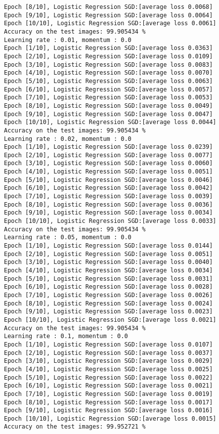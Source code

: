\documentclass[10pt]{article}
\newcommand{\0}{{\mathbf{0}}}
\newcommand{\1}{{\mathbf{1}}}
\begin{document}
\begin{verbatim}
Epoch [8/10], Logistic Regression SGD:[average loss 0.0068]
Epoch [9/10], Logistic Regression SGD:[average loss 0.0064]
Epoch [10/10], Logistic Regression SGD:[average loss 0.0061]
Accuracy on the test images: 99.905434 %
Learning rate : 0.01, momentum : 0.0
Epoch [1/10], Logistic Regression SGD:[average loss 0.0363]
Epoch [2/10], Logistic Regression SGD:[average loss 0.0109]
Epoch [3/10], Logistic Regression SGD:[average loss 0.0083]
Epoch [4/10], Logistic Regression SGD:[average loss 0.0070]
Epoch [5/10], Logistic Regression SGD:[average loss 0.0063]
Epoch [6/10], Logistic Regression SGD:[average loss 0.0057]
Epoch [7/10], Logistic Regression SGD:[average loss 0.0053]
Epoch [8/10], Logistic Regression SGD:[average loss 0.0049]
Epoch [9/10], Logistic Regression SGD:[average loss 0.0047]
Epoch [10/10], Logistic Regression SGD:[average loss 0.0044]
Accuracy on the test images: 99.905434 %
Learning rate : 0.02, momentum : 0.0
Epoch [1/10], Logistic Regression SGD:[average loss 0.0239]
Epoch [2/10], Logistic Regression SGD:[average loss 0.0077]
Epoch [3/10], Logistic Regression SGD:[average loss 0.0060]
Epoch [4/10], Logistic Regression SGD:[average loss 0.0051]
Epoch [5/10], Logistic Regression SGD:[average loss 0.0046]
Epoch [6/10], Logistic Regression SGD:[average loss 0.0042]
Epoch [7/10], Logistic Regression SGD:[average loss 0.0039]
Epoch [8/10], Logistic Regression SGD:[average loss 0.0036]
Epoch [9/10], Logistic Regression SGD:[average loss 0.0034]
Epoch [10/10], Logistic Regression SGD:[average loss 0.0033]
Accuracy on the test images: 99.905434 %
Learning rate : 0.05, momentum : 0.0
Epoch [1/10], Logistic Regression SGD:[average loss 0.0144]
Epoch [2/10], Logistic Regression SGD:[average loss 0.0051]
Epoch [3/10], Logistic Regression SGD:[average loss 0.0040]
Epoch [4/10], Logistic Regression SGD:[average loss 0.0034]
Epoch [5/10], Logistic Regression SGD:[average loss 0.0031]
Epoch [6/10], Logistic Regression SGD:[average loss 0.0028]
Epoch [7/10], Logistic Regression SGD:[average loss 0.0026]
Epoch [8/10], Logistic Regression SGD:[average loss 0.0024]
Epoch [9/10], Logistic Regression SGD:[average loss 0.0023]
Epoch [10/10], Logistic Regression SGD:[average loss 0.0021]
Accuracy on the test images: 99.905434 %
Learning rate : 0.1, momentum : 0.0
Epoch [1/10], Logistic Regression SGD:[average loss 0.0107]
Epoch [2/10], Logistic Regression SGD:[average loss 0.0037]
Epoch [3/10], Logistic Regression SGD:[average loss 0.0029]
Epoch [4/10], Logistic Regression SGD:[average loss 0.0025]
Epoch [5/10], Logistic Regression SGD:[average loss 0.0022]
Epoch [6/10], Logistic Regression SGD:[average loss 0.0021]
Epoch [7/10], Logistic Regression SGD:[average loss 0.0019]
Epoch [8/10], Logistic Regression SGD:[average loss 0.0017]
Epoch [9/10], Logistic Regression SGD:[average loss 0.0016]
Epoch [10/10], Logistic Regression SGD:[average loss 0.0015]
Accuracy on the test images: 99.952721 %
\end{verbatim}
\end{document}
